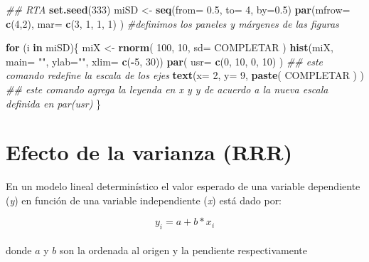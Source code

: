 \documentclass[]{book}
\newenvironment{Shaded}{\begin{snugshade}}{\end{snugshade}}
\newcommand{\CommentTok}[1]{\textcolor[rgb]{0.56,0.35,0.01}{\textit{#1}}}
\newcommand{\ControlFlowTok}[1]{\textcolor[rgb]{0.13,0.29,0.53}{\textbf{#1}}}
\newcommand{\DataTypeTok}[1]{\textcolor[rgb]{0.13,0.29,0.53}{#1}}
\newcommand{\DecValTok}[1]{\textcolor[rgb]{0.00,0.00,0.81}{#1}}
\newcommand{\FloatTok}[1]{\textcolor[rgb]{0.00,0.00,0.81}{#1}}
\newcommand{\KeywordTok}[1]{\textcolor[rgb]{0.13,0.29,0.53}{\textbf{#1}}}
\newcommand{\NormalTok}[1]{#1}
\newcommand{\OperatorTok}[1]{\textcolor[rgb]{0.81,0.36,0.00}{\textbf{#1}}}
\newcommand{\StringTok}[1]{\textcolor[rgb]{0.31,0.60,0.02}{#1}}
\begin{document}
\begin{Shaded}
\begin{Highlighting}[]
\CommentTok{## RTA}
\KeywordTok{set.seed}\NormalTok{(}\DecValTok{333}\NormalTok{)}
\NormalTok{miSD <-}\StringTok{ }\KeywordTok{seq}\NormalTok{(}\DataTypeTok{from=} \FloatTok{0.5}\NormalTok{, }\DataTypeTok{to=} \DecValTok{4}\NormalTok{, }\DataTypeTok{by=}\FloatTok{0.5}\NormalTok{)}
\KeywordTok{par}\NormalTok{(}\DataTypeTok{mfrow=} \KeywordTok{c}\NormalTok{(}\DecValTok{4}\NormalTok{,}\DecValTok{2}\NormalTok{), }\DataTypeTok{mar=} \KeywordTok{c}\NormalTok{(}\DecValTok{3}\NormalTok{, }\DecValTok{1}\NormalTok{, }\DecValTok{1}\NormalTok{, }\DecValTok{1}\NormalTok{) ) }\CommentTok{#definimos los paneles y márgenes de las figuras}

  \ControlFlowTok{for}\NormalTok{ (i }\ControlFlowTok{in}\NormalTok{ miSD)\{}
\NormalTok{    miX <-}\StringTok{ }\KeywordTok{rnorm}\NormalTok{( }\DecValTok{100}\NormalTok{, }\DecValTok{10}\NormalTok{, }\DataTypeTok{sd=}\NormalTok{ COMPLETAR )}
    \KeywordTok{hist}\NormalTok{(miX, }\DataTypeTok{main=} \StringTok{""}\NormalTok{, }\DataTypeTok{ylab=}\StringTok{""}\NormalTok{, }\DataTypeTok{xlim=} \KeywordTok{c}\NormalTok{(}\OperatorTok{-}\DecValTok{5}\NormalTok{, }\DecValTok{30}\NormalTok{))}
    \KeywordTok{par}\NormalTok{( }\DataTypeTok{usr=} \KeywordTok{c}\NormalTok{(}\DecValTok{0}\NormalTok{, }\DecValTok{10}\NormalTok{, }\DecValTok{0}\NormalTok{, }\DecValTok{10}\NormalTok{) ) }\CommentTok{## este comando redefine la escala de los ejes}
    \KeywordTok{text}\NormalTok{(}\DataTypeTok{x=} \DecValTok{2}\NormalTok{, }\DataTypeTok{y=} \DecValTok{9}\NormalTok{, }\KeywordTok{paste}\NormalTok{( COMPLETAR ) ) }\CommentTok{## este comando agrega la leyenda en x y y de acuerdo a la nueva escala definida en par(usr)}
\NormalTok{    \}}
\end{Highlighting}
\end{Shaded}

\hypertarget{efecto-de-la-varianza-rrr}{%
\section{Efecto de la varianza (RRR)}\label{efecto-de-la-varianza-rrr}}

En un modelo lineal determinístico el valor esperado de una variable dependiente (\emph{y}) en función de una variable independiente (\emph{x}) está dado por:

\[y_{i} = a + b*x_{i}\]\\
donde \(a\) y \(b\) son la ordenada al origen y la pendiente respectivamente
\end{document}
